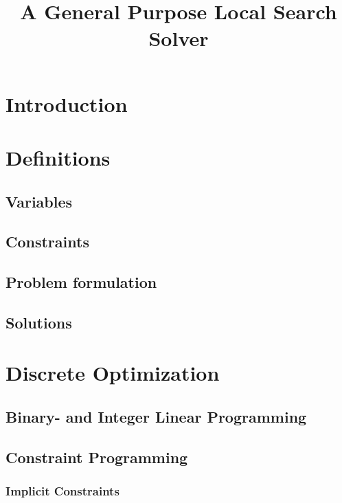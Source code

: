 \documentclass[a4paper,11pt]{article}
\title{A General Purpose Local Search Solver}
\begin{document}
\maketitle

\tableofcontents
\newpage
\section{Introduction}
 
 
 
\section{Definitions} 
  \subsection{Variables} 
  \subsection{Constraints}
  \subsection{Problem formulation} %
  
  \subsection{Solutions}
  
  
\newpage  
\section{Discrete Optimization}  
  
  \subsection{Binary- and Integer Linear Programming} %
  
  
  \subsection{Constraint Programming}
  
    \subsubsection{Implicit Constraints}
    
\end{document}
